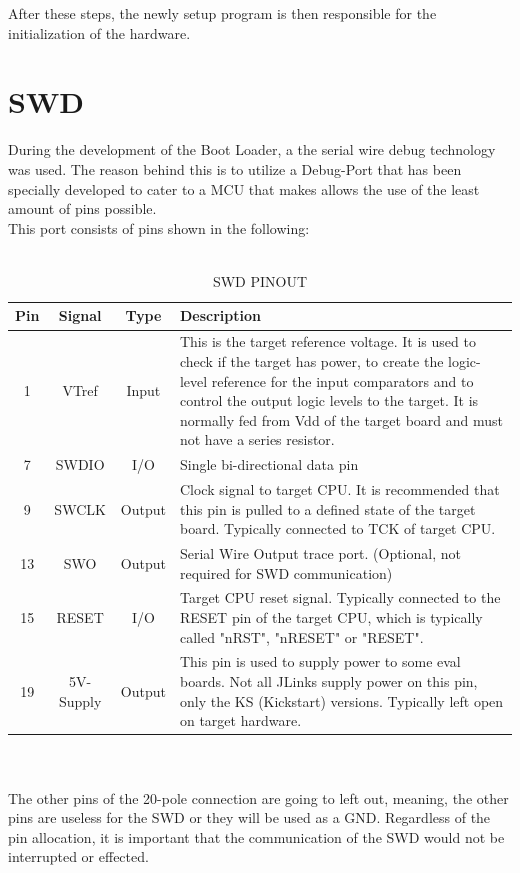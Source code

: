 After these steps, the newly setup program is then responsible for the initialization 
of the hardware.\\

\section{SWD}
During the development of the Boot Loader, a the serial wire debug technology was used. 
The reason behind this is to utilize a Debug-Port that has been specially developed to 
cater to a MCU that makes allows the use of the least amount of pins possible.\\
This port consists of pins shown in the following:\\\\
\begin{table}
\caption{SWD PINOUT}
\begin{tabular}{|c|c|c|p{10cm}|}
\hline \hline
	Pin & Signal & Type & Description \\ \hline
1 & VTref & Input & This is the target reference voltage. It is used to
 check if the target has power, to create the logic-level reference for
 the input comparators and to control the output logic levels to the target.
 It is normally fed from Vdd of the target board and must not have a series resistor.\\ \hline
7 & SWDIO & I/O & Single bi-directional data pin\\ \hline
9 & SWCLK & Output & Clock signal to target CPU. It is recommended that
 this pin is pulled to a defined state of the target board. Typically
 connected to TCK of target CPU.\\ \hline
13 & SWO & Output & Serial Wire Output trace port. (Optional, not required
for SWD communication)\\ \hline
15 & RESET & I/O & Target CPU reset signal. Typically connected to the
 RESET pin of the target CPU, which is typically called "nRST", "nRESET"
 or "RESET".\\ \hline
19 & 5V-Supply & Output & This pin is used to supply power to some eval boards.
Not all JLinks supply power on this pin, only the KS (Kickstart) versions.
Typically left open on target hardware.\\ \hline
\end{tabular}
\end{table}\\\\

The other pins of the 20-pole connection are going to left out, meaning, the other 
pins are useless for the SWD or they will be used as a GND. Regardless of the pin allocation, 
it is important that the communication of the SWD would not be interrupted or effected. 

